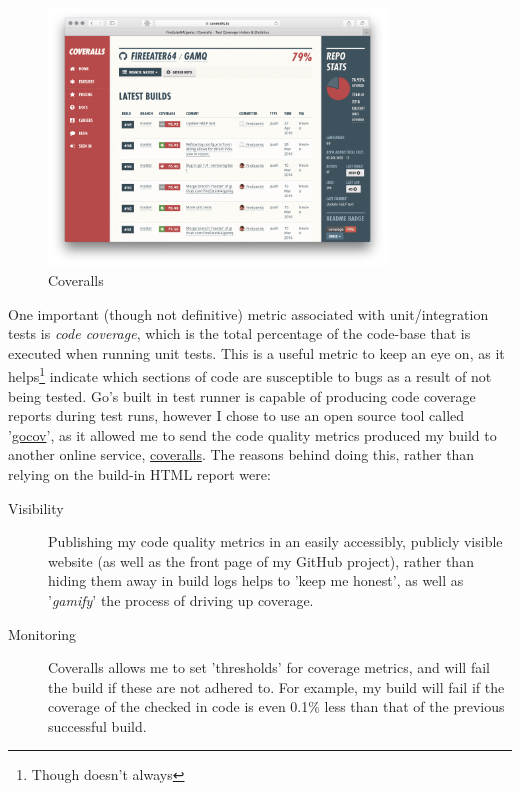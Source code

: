 \begin{figure}[H]
  \includegraphics[width=0.8\textwidth]{figures/coverallsScreenshot}
  \centering
  \caption{Coveralls}
  \label{fig:coveralls}
\end{figure}

One important (though not definitive) metric associated with unit/integration
tests is \emph{code coverage}, which is the total percentage of the code-base
that is executed when running unit tests. This is a useful metric to keep an eye
on, as it helps\footnote{Though doesn't always} indicate which sections of code
are susceptible to bugs as a result of not being tested. Go's built in test
runner is capable of producing code coverage reports during test runs, however I
chose to use an open source tool called
'\href{https://github.com/axw/gocov}{gocov}', as it allowed me to send the code
quality metrics produced my build to another online service,
\href{https://coveralls.io/}{coveralls}. The reasons behind doing this, rather
than relying on the build-in HTML report were:

\begin{description}
  \item[Visibility] Publishing my code quality metrics in an easily accessibly,
  publicly visible website (as well as the front page of my GitHub project),
  rather than hiding them away in build logs helps to 'keep me honest', as well
  as '\textit{\gls{gamify}}' the process of driving up coverage.
  \item[Monitoring] Coveralls allows me to set 'thresholds' for coverage
  metrics, and will fail the build if these are not adhered to. For example, my
  build will fail if the coverage of the checked in code is even 0.1\% less than
  that of the previous successful build.
\end{description}

